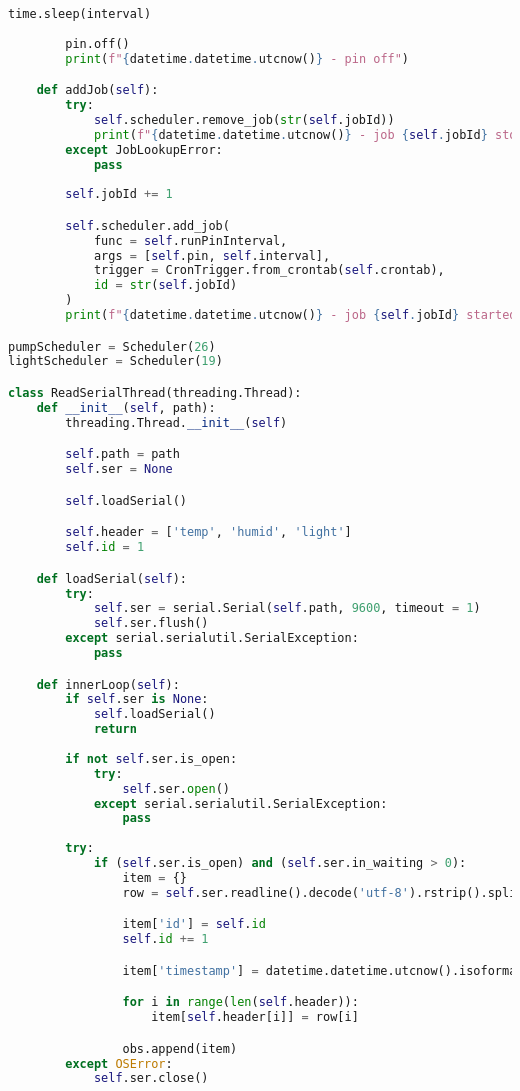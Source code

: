 \documentclass[a4paper,12pt,twoside,openright,titlepage]{book}
\begin{document}
\begin{lstlisting}[title={raspberrypi/api/data.py}, language=Python]
        time.sleep(interval)
        
        pin.off()
        print(f"{datetime.datetime.utcnow()} - pin off")

    def addJob(self):
        try:
            self.scheduler.remove_job(str(self.jobId))
            print(f"{datetime.datetime.utcnow()} - job {self.jobId} stopped")
        except JobLookupError:
            pass
        
        self.jobId += 1

        self.scheduler.add_job(
            func = self.runPinInterval,
            args = [self.pin, self.interval],
            trigger = CronTrigger.from_crontab(self.crontab),
            id = str(self.jobId)
        )
        print(f"{datetime.datetime.utcnow()} - job {self.jobId} started")

pumpScheduler = Scheduler(26)
lightScheduler = Scheduler(19)

class ReadSerialThread(threading.Thread):
    def __init__(self, path):
        threading.Thread.__init__(self)

        self.path = path
        self.ser = None

        self.loadSerial()

        self.header = ['temp', 'humid', 'light']
        self.id = 1

    def loadSerial(self):
        try:
            self.ser = serial.Serial(self.path, 9600, timeout = 1)
            self.ser.flush()
        except serial.serialutil.SerialException:
            pass

    def innerLoop(self):
        if self.ser is None:
            self.loadSerial()
            return
        
        if not self.ser.is_open:
            try:
                self.ser.open()
            except serial.serialutil.SerialException:
                pass
        
        try:
            if (self.ser.is_open) and (self.ser.in_waiting > 0):
                item = {}
                row = self.ser.readline().decode('utf-8').rstrip().split(',')

                item['id'] = self.id
                self.id += 1

                item['timestamp'] = datetime.datetime.utcnow().isoformat()

                for i in range(len(self.header)):
                    item[self.header[i]] = row[i]

                obs.append(item)
        except OSError:
            self.ser.close()


\end{lstlisting}
\end{document}
